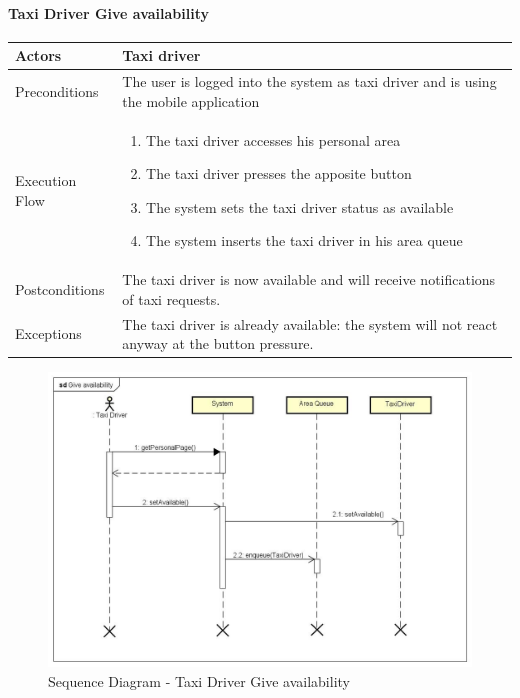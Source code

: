 \paragraph{Taxi Driver Give availability}
\begin{center}
	\begin{tabular}{ | l | p{8cm} |}
		\hline Actors & Taxi driver
		\\ \hline
		Preconditions &
		The user is logged into the system as taxi driver and is using the mobile application
		\\ \hline
		Execution Flow &
		\begin{enumerate}
			\item The taxi driver accesses his personal area
			\item The taxi driver presses the apposite button
			\item The system sets the taxi driver status as available
			\item The system inserts the taxi driver in his area queue
		\end{enumerate}
		\\ \hline
		Postconditions & 
		The taxi driver is now available and will receive notifications of taxi requests.
		\\ \hline
		Exceptions &
		The taxi driver is already available: the system will not react anyway at the button
		pressure.
		\\ \hline
	\end{tabular}
\end{center}
\newpage
\begin{landscape}
\begin{figure}[!h]
	\begin{center}			
		\includegraphics[height=\textheight]{../SE2_SD/GiveAvailability}
		\caption{Sequence Diagram - Taxi Driver Give availability}	
	\end{center}
\end{figure}
\end{landscape}
\newpage
